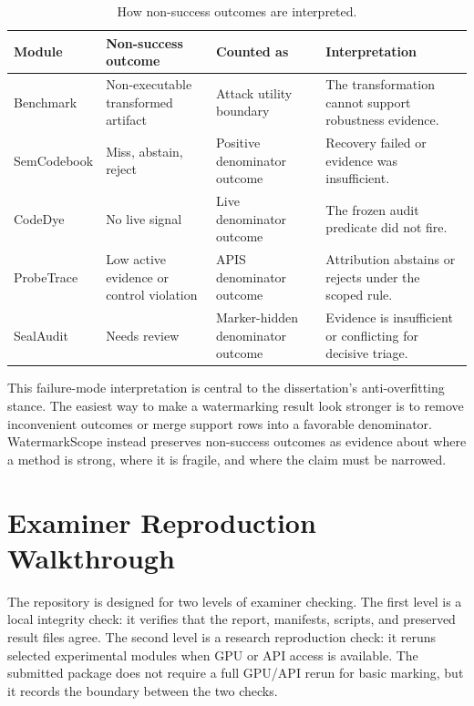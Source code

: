 \begin{table}[htbp]
\centering
\caption{How non-success outcomes are interpreted.}
\label{tab:failure-mode-interpretation}
\tighttable
\begin{tabularx}{\textwidth}{@{}L{2.15cm}L{2.35cm}YY@{}}
\toprule
Module & Non-success outcome & Counted as & Interpretation \\
\midrule
Benchmark & Non-executable transformed artifact & Attack utility boundary & The transformation cannot support robustness evidence. \\
SemCodebook & Miss, abstain, reject & Positive denominator outcome & Recovery failed or evidence was insufficient. \\
CodeDye & No live signal & Live denominator outcome & The frozen audit predicate did not fire. \\
ProbeTrace & Low active evidence or control violation & APIS denominator outcome & Attribution abstains or rejects under the scoped rule. \\
SealAudit & Needs review & Marker-hidden denominator outcome & Evidence is insufficient or conflicting for decisive triage. \\
\bottomrule
\end{tabularx}
\end{table}

This failure-mode interpretation is central to the dissertation's anti-overfitting stance. The easiest way to make a watermarking result look stronger is to remove inconvenient outcomes or merge support rows into a favorable denominator. WatermarkScope instead preserves non-success outcomes as evidence about where a method is strong, where it is fragile, and where the claim must be narrowed.

\section{Examiner Reproduction Walkthrough}

The repository is designed for two levels of examiner checking. The first level is a local integrity check: it verifies that the report, manifests, scripts, and preserved result files agree. The second level is a research reproduction check: it reruns selected experimental modules when GPU or API access is available. The submitted package does not require a full GPU/API rerun for basic marking, but it records the boundary between the two checks.

